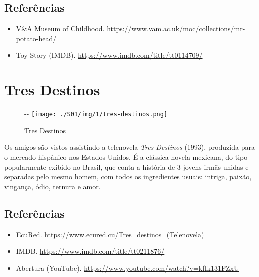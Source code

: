 \hypertarget{referuxeancias}{%
\subsection{Referências}\label{referuxeancias}}

\begin{itemize}
\tightlist
\item
  \sloppy V&A Museum of Childhood. \url{https://www.vam.ac.uk/moc/collections/mr-potato-head/}
\item
  \sloppy Toy Story (IMDB). \url{https://www.imdb.com/title/tt0114709/}
\end{itemize}

\hypertarget{tres-destinos}{%
\section{Tres Destinos}\label{tres-destinos}}

\begin{figure}[!ht]
  \begin{adjustwidth}{-\oddsidemargin-1in}{-\rightmargin}
    \centering
    \texttt{[image: ./S01/img/1/tres-destinos.png]}
    \caption{Tres Destinos\label{fig:tres-destinos}}
  \end{adjustwidth}
\end{figure}

Os amigos são vistos assistindo a telenovela \emph{Tres Destinos}
(1993), produzida para o mercado hispânico nos Estados Unidos. É a
clássica novela mexicana, do tipo popularmente exibido no Brasil, que
conta a história de 3 jovens irmãs unidas e separadas pelo mesmo homem,
com todos os ingredientes usuais: intriga, paixão, vingança, ódio,
ternura e amor.

\hypertarget{referuxeancias-1}{%
\subsection{Referências}\label{referuxeancias-1}}

\begin{itemize}
\tightlist
\item
  \sloppy EcuRed. \url{https://www.ecured.cu/Tres_destinos_(Telenovela)}
\item
  \sloppy IMDB. \url{https://www.imdb.com/title/tt0211876/}
\item
  \sloppy Abertura (YouTube). \url{https://www.youtube.com/watch?v=kfIk131FZxU}
\end{itemize}


